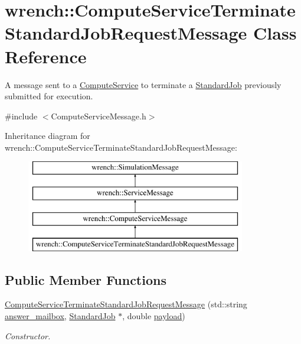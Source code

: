 \hypertarget{classwrench_1_1_compute_service_terminate_standard_job_request_message}{}\section{wrench\+:\+:Compute\+Service\+Terminate\+Standard\+Job\+Request\+Message Class Reference}
\label{classwrench_1_1_compute_service_terminate_standard_job_request_message}


A message sent to a \hyperlink{classwrench_1_1_compute_service}{Compute\+Service} to terminate a \hyperlink{classwrench_1_1_standard_job}{Standard\+Job} previously submitted for execution.  




{\ttfamily \#include $<$Compute\+Service\+Message.\+h$>$}

Inheritance diagram for wrench\+:\+:Compute\+Service\+Terminate\+Standard\+Job\+Request\+Message\+:\begin{figure}[H]
\begin{center}
\leavevmode
\includegraphics[height=4.000000cm]{classwrench_1_1_compute_service_terminate_standard_job_request_message}
\end{center}
\end{figure}
\subsection*{Public Member Functions}
\begin{DoxyCompactItemize}
\item 
\hyperlink{classwrench_1_1_compute_service_terminate_standard_job_request_message_a8b9be8c807df77a00d1cb899551b5256}{Compute\+Service\+Terminate\+Standard\+Job\+Request\+Message} (std\+::string \hyperlink{classwrench_1_1_compute_service_terminate_standard_job_request_message_a02029e980925195d42060664bc9fbd7c}{answer\+\_\+mailbox}, \hyperlink{classwrench_1_1_standard_job}{Standard\+Job} $\ast$, double \hyperlink{classwrench_1_1_simulation_message_a914f2732713f7c02898e66f05a7cb8a1}{payload})
\begin{DoxyCompactList}\small\item\em Constructor. \end{DoxyCompactList}\end{DoxyCompactItemize}

